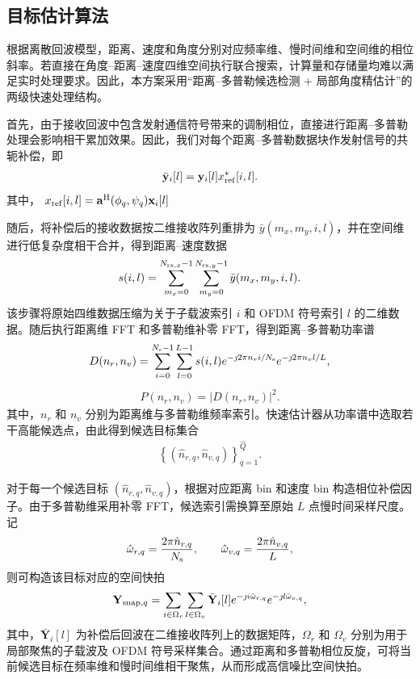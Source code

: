 \documentclass[onecolumn,10pt]{IEEEtran}
\begin{document}
\subsection{目标估计算法}
根据离散回波模型，距离、速度和角度分别对应频率维、慢时间维和空间维的相位斜率。若直接在角度--距离--速度四维空间执行联合搜索，计算量和存储量均难以满足实时处理要求。因此，本方案采用“距离--多普勒候选检测 + 局部角度精估计”的两级快速处理结构。

首先，由于接收回波中包含发射通信符号带来的调制相位，直接进行距离--多普勒处理会影响相干累加效果。因此，我们对每个距离--多普勒数据块作发射信号的共轭补偿，即
\begin{align}
    \bar{\mathbf{y}}_i[l]
    =
    \mathbf{y}_i[l]x_{\rm ref}^{*}[i,l].
\end{align}
其中， $x_{\rm ref}[i,l]=\mathbf{a}^{\rm H}(\phi_q,\psi_q)\mathbf{x}_i[l]$ 

随后，将补偿后的接收数据按二维接收阵列重排为
$\bar{y}(m_x,m_y,i,l)$，并在空间维进行低复杂度相干合并，得到距离--速度数据
\begin{align}
    s(i,l)
    =
    \sum_{m_x=0}^{N_{{\rm rx},x}-1}
    \sum_{m_y=0}^{N_{{\rm rx},y}-1}
    \bar{y}(m_x,m_y,i,l).
\end{align}
该步骤将原始四维数据压缩为关于子载波索引 $i$ 和 OFDM 符号索引 $l$ 的二维数据。随后执行距离维 FFT 和多普勒维补零 FFT，得到距离--多普勒功率谱
\begin{align}
    D(n_r,n_v)
    =
    \sum_{i=0}^{N_{\rm s}-1}
    \sum_{l=0}^{L-1}
    s(i,l)
    e^{-\jmath 2\pi n_r i/N_{\rm s}}
    e^{-\jmath 2\pi n_v l/L},
\end{align}
\begin{align}
    P(n_r,n_v)=|D(n_r,n_v)|^2.
\end{align}
其中，$n_r$ 和 $n_v$ 分别为距离维与多普勒维频率索引。快速估计器从功率谱中选取若干高能候选点，由此得到候选目标集合
\begin{align}
    \left\{
    (\hat n_{r,q},\hat n_{v,q})
    \right\}_{q=1}^{\hat Q}.
\end{align}

对于每一个候选目标 $(\hat n_{r,q},\hat n_{v,q})$，根据对应距离 bin 和速度 bin 构造相位补偿因子。由于多普勒维采用补零 FFT，候选索引需换算至原始 $L$ 点慢时间采样尺度。记
\begin{align}
    \hat{\omega}_{r,q}=\frac{2\pi \hat n_{r,q}}{N_{\rm s}},
    \qquad
    \hat{\omega}_{v,q}=\frac{2\pi \hat n_{v,q}}{L},
\end{align}
则可构造该目标对应的空间快拍
\begin{align}
    \mathbf{Y}_{{\rm snap},q}
    =
    \sum_{i\in\Omega_r}
    \sum_{l\in\Omega_v}
    \bar{\mathbf{Y}}_i[l]
    e^{-\jmath i\hat{\omega}_{r,q}}
    e^{-\jmath l\hat{\omega}_{v,q}},
\end{align}
其中，$\bar{\mathbf{Y}}_i[l]$ 为补偿后回波在二维接收阵列上的数据矩阵，$\Omega_r$ 和 $\Omega_v$ 分别为用于局部聚焦的子载波及 OFDM 符号采样集合。通过距离和多普勒相位反旋，可将当前候选目标在频率维和慢时间维相干聚焦，从而形成高信噪比空间快拍。
\end{document}
